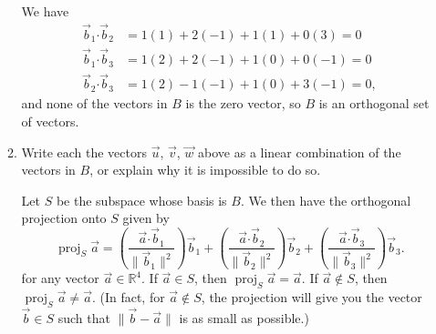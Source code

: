 \documentclass[12pt]{article}
\newcommand{\len}[1]{\lVert #1\rVert}
\newcommand{\R}{\mathbb{R}}
\newcommand{\dotp}{\boldsymbol{\cdot}}
\DeclareMathOperator{\proj}{proj}
\begin{document}
\begin{enumerate}
\begin{enumerate}
\bigskip

We have
\begin{align*}
 \vec{b}_1\dotp \vec{b}_2 &= 1(1)+2(-1)+1(1)+0(3) = 0\\
 \vec{b}_1\dotp \vec{b}_3 &= 1(2)+2(-1)+1(0)+0(-1) = 0\\
 \vec{b}_2\dotp \vec{b}_3 &= 1(2)-1(-1)+1(0)+3(-1) = 0,
\end{align*}
and none of the vectors in $B$ is the zero vector, so $B$ is an orthogonal set of vectors.

 \item Write each the vectors $\vec{u}$, $\vec{v}$, $\vec{w}$ above as a linear combination of the vectors in $B$, or explain why it is impossible to do so.

\bigskip

Let $S$ be the subspace whose basis is $B$. We then have the orthogonal projection onto $S$ given by
\[
 \proj_S\vec{a} = \left(\frac{\vec{a}\dotp \vec{b}_1}{\len{\vec{b}_1}^2}\right)\vec{b}_1+\left(\frac{\vec{a}\dotp \vec{b}_2}{\len{\vec{b}_2}^2}\right)\vec{b}_2+\left(\frac{\vec{a}\dotp \vec{b}_3}{\len{\vec{b}_3}^2}\right)\vec{b}_3.
\]
for any vector $\vec{a}\in\R^4$. If $\vec{a}\in S$, then $\proj_S\vec{a} = \vec{a}$. If $\vec{a}\notin S$, then $\proj_S\vec{a}\neq \vec{a}$. (In fact, for $\vec{a}\notin S$, the projection will give you the vector $\vec{b}\in S$ such that $\len{\vec{b}-\vec{a}}$ is as small as possible.)


\end{enumerate}
\end{enumerate}
\end{document}
